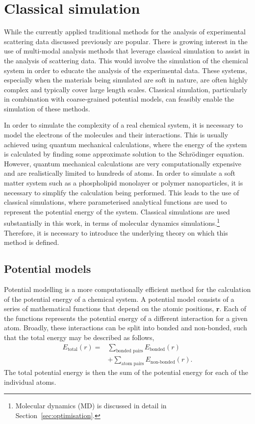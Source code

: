 \section{Classical simulation}
\label{sec:classical}
While the currently applied traditional methods for the analysis of experimental scattering data discussed previously are popular.
There is growing interest in the use of multi-modal analysis methods that leverage classical simulation to assist in the analysis of scattering data.\autocite{ivanovic_temperature-dependent_2018,scoppola_combining_2018,dabkowska_modulation_2014,hub_interpreting_2018}
This would involve the simulation of the chemical system in order to educate the analysis of the experimental data.
These systems, especially when the materials being simulated are soft in nature, are often highly complex and typically cover large length scales.
Classical simulation, particularly in combination with coarse-grained potential models, can feasibly enable the simulation of these methods.

In order to simulate the complexity of a real chemical system, it is necessary to model the electrons of the molecules and their interactions.
This is usually achieved using quantum mechanical calculations, where the energy of the system is calculated by finding some approximate solution to the Schr\"{o}dinger equation.
However, quantum mechanical calculations are very computationally expensive and are realistically limited to hundreds of atoms.
In order to simulate a soft matter system such as a phospholipid monolayer or polymer nanoparticles, it is necessary to simplify the calculation being performed.
This leads to the use of classical simulations, where parameterised analytical functions are used to represent the potential energy of the system.
Classical simulations are used substantially in this work, in terms of molecular dynamics simulations.\footnote{Molecular dynamics (MD) is discussed in detail in Section~\ref{sec:optimisation}.}
Therefore, it is necessary to introduce the underlying theory on which this method is defined.

\subsection{Potential models}
\label{sec:potentmodels}
Potential modelling is a more computationally efficient method for the calculation of the potential energy of a chemical system.
A potential model consists of a series of mathematical functions that depend on the atomic positions, $\mathbf{r}$.
Each of the functions represents the potential energy of a different interaction for a given atom.
Broadly, these interactions can be split into bonded and non-bonded, such that the total energy may be described as follows,
%
\begin{equation}
\begin{aligned}
  E_{\text{total}}(r) = & \sum_{\text{bonded pairs}}{E_{\text{bonded}}(r)} \\
  & + \sum_{\text{atom pairs}}{E_{\text{non-bonded}}(r)}.
\end{aligned}
\end{equation}
%
The total potential energy is then the sum of the potential energy for each of the individual atoms.

